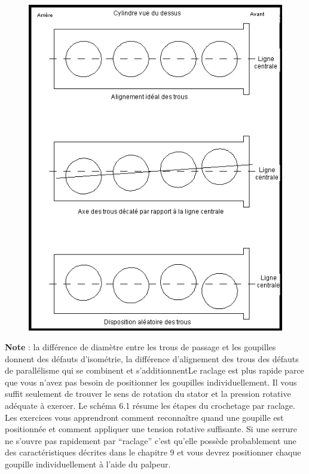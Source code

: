 \documentclass[a4paper,french,11pt,twoside]{report}
\begin{document}
\begin{figure}[h] \begin{center}
        \includegraphics[scale=0.7]{images/Image15}
        \caption{}
\end{center} \end{figure}


\noindent \textbf{Note} : la différence de diamètre entre les trous de passage et les goupilles donnent des défauts d'isométrie, la différence d'alignement des trous des défauts de parallélisme qui se combinent et s'additionnentLe raclage est plus rapide parce que vous n'avez pas besoin de positionner les goupilles individuellement. Il vous suffit seulement de trouver le sens de rotation du stator et la pression rotative adéquate à exercer. Le schéma 6.1 résume les étapes du crochetage par raclage. Les exercices vous apprendront comment reconnaître quand une goupille est positionnée et comment appliquer une tension rotative suffisante. Si une serrure ne s'ouvre pas rapidement par \enquote{raclage} c'est qu'elle possède probablement une des caractéristiques décrites dans le chapitre 9 et vous devrez positionner chaque goupille individuellement à l'aide du palpeur.
\end{document}
